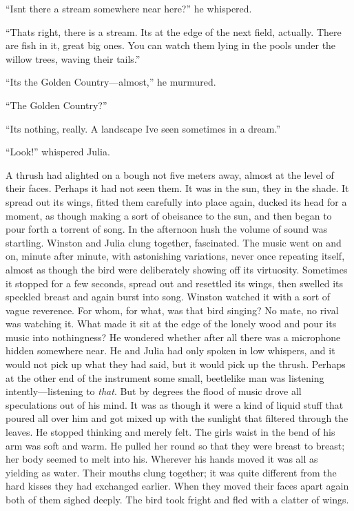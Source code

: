 ``Isn\textquotesingle t there a stream somewhere near here?'' he
whispered.

``That\textquotesingle s right, there is a stream. It\textquotesingle s
at the edge of the next field, actually. There are fish in it, great big
ones. You can watch them lying in the pools under the willow trees,
waving their tails.''

``It\textquotesingle s the Golden Country---almost,'' he murmured.

``The Golden Country?''

``It\textquotesingle s nothing, really. A landscape I\textquotesingle ve
seen sometimes in a dream.''

``Look!'' whispered Julia.

A thrush had alighted on a bough not five meters away, almost at the
level of their faces. Perhaps it had not seen them. It was in the sun,
they in the shade. It spread out its wings, fitted them carefully into
place again, ducked its head for a moment, as though making a sort of
obeisance to the sun, and then began to pour forth a torrent of song. In
the afternoon hush the volume of sound was startling. Winston and Julia
clung together, fascinated. The music went on and on, minute after
minute, with astonishing variations, never once repeating itself, almost
as though the bird were deliberately showing off its virtuosity.
Sometimes it stopped for a few seconds, spread out and resettled its
wings, then swelled its speckled breast and again burst into song.
Winston watched it with a sort of vague reverence. For whom, for what,
was that bird singing? No mate, no rival was watching it. What made it
sit at the edge of the lonely wood and pour its music into nothingness?
He wondered whether after all there was a microphone hidden somewhere
near. He and Julia had only spoken in low whispers, and it would not
pick up what they had said, but it would pick up the thrush. Perhaps at
the other end of the instrument some small, beetlelike man was listening
intently---listening to \emph{that}. But by degrees the flood of music
drove all speculations out of his mind. It was as though it were a kind
of liquid stuff that poured all over him and got mixed up with the
sunlight that filtered through the leaves. He stopped thinking and
merely felt. The girl\textquotesingle s waist in the bend of his arm was
soft and warm. He pulled her round so that they were breast to breast;
her body seemed to melt into his. Wherever his hands moved it was all as
yielding as water. Their mouths clung together; it was quite different
from the hard kisses they had exchanged earlier. When they moved their
faces apart again both of them sighed deeply. The bird took fright and
fled with a clatter of wings.

